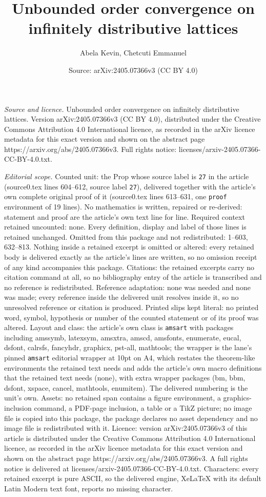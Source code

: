 \documentclass[10pt,a4paper]{amsart}
\title[Unbounded order convergence on infinitely distributive latti]{Unbounded order convergence on infinitely distributive lattices}
\author{Abela Kevin, Chetcuti Emmanuel}
\date{Source: arXiv:2405.07366v3 (CC BY 4.0)}
\begin{document}
\maketitle

\noindent\emph{Source and licence.} Unbounded order convergence on infinitely distributive lattices. Version arXiv:2405.07366v3 (CC BY 4.0), distributed under the Creative Commons Attribution 4.0 International licence, as recorded in the arXiv licence metadata for this exact version and shown on the abstract page https://arxiv.org/abs/2405.07366v3. Full rights notice: licenses/arxiv-2405.07366-CC-BY-4.0.txt.\par\smallskip

\noindent\textit{Editorial scope.} Counted unit: the Prop whose source label is \texttt{27} in the article (source0.tex lines 604--612, source label \texttt{27}), delivered together with the article's own complete original proof of it (source0.tex lines 613--631, one \texttt{proof} environment of 19 lines). No mathematics is written, repaired or re-derived: statement and proof are the article's own text line for line. Required context retained uncounted: none. Every definition, display and label of those lines is retained unchanged. Omitted from this package and not redistributed: 1--603, 632--813. Nothing inside a retained excerpt is omitted or altered: every retained body is delivered exactly as the article's lines are written, so no omission receipt of any kind accompanies this package. Citations: the retained excerpts carry no citation command at all, so no bibliography entry of the article is transcribed and no reference is redistributed. Reference adaptation: none was needed and none was made; every reference inside the delivered unit resolves inside it, so no unresolved reference or citation is produced. Printed slips kept literal: no printed word, symbol, hypothesis or number of the counted statement or of its proof was altered. Layout and class: the article's own class is \texttt{amsart} with packages including amssymb, latexsym, amsxtra, amscd, amsfonts, enumerate, eucal, dsfont, calrsfs, fancyhdr, graphicx, pst-all, mathtools; the wrapper is the lane's pinned \texttt{amsart} editorial wrapper at 10pt on A4, which restates the theorem-like environments the retained text needs and adds the article's own macro definitions that the retained text needs (none), with extra wrapper packages (bm, bbm, dsfont, xspace, cancel, mathtools, enumitem). The delivered numbering is the unit's own. Assets: no retained span contains a figure environment, a graphics-inclusion command, a PDF-page inclusion, a table or a TikZ picture; no image file is copied into this package, the package declares no asset dependency and no image file is redistributed with it. Licence: version arXiv:2405.07366v3 of this article is distributed under the Creative Commons Attribution 4.0 International licence, as recorded in the arXiv licence metadata for this exact version and shown on the abstract page https://arxiv.org/abs/2405.07366v3. A full rights notice is delivered at licenses/arxiv-2405.07366-CC-BY-4.0.txt. Characters: every retained excerpt is pure ASCII, so the delivered engine, XeLaTeX with its default Latin Modern text font, reports no missing character.
\end{document}
